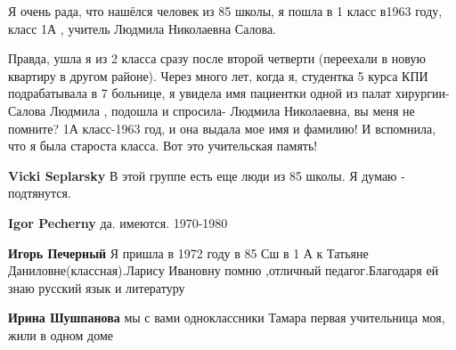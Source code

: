 \begin{itemize}
Я очень рада, что нашёлся человек из 85 школы, я пошла в 1 класс в1963 году,
класс 1А , учитель Людмила Николаевна Салова.

Правда, ушла я из 2 класса сразу после второй четверти (переехали в новую
квартиру в другом районе). Через много лет, когда я, студентка 5 курса КПИ
подрабатывала в 7 больнице, я увидела имя пациентки одной из палат хирургии-
Салова Людмила , подошла и спросила- Людмила Николаевна, вы меня не помните? 1А
класс-1963 год, и она выдала мое имя и фамилию! И вспомнила, что я была
староста класса. Вот это учительская память!

\begin{itemize}
 
\textbf{Vicki Seplarsky} В этой группе есть еще люди из 85 школы. Я думаю - подтянутся.

\begin{itemize}
 
\textbf{Igor Pecherny} да. имеются. 1970-1980


 
\textbf{Игорь Печерный} Я пришла в 1972 году в 85 Сш в 1 А к Татьяне
Даниловне(классная).Ларису Ивановну помню ,отличный педагог.Благодаря ей знаю
русский язык и литературу


 
\textbf{Ирина Шушпанова} мы с вами одноклассники Тамара первая учительница моя, жили в одном доме


 


\end{itemize}
\end{itemize}
\end{itemize}
